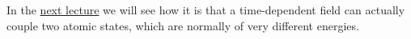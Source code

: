 In the \href{}{next lecture} we will see how it is that a time-dependent field can actually couple two atomic states, which are normally of very different energies.